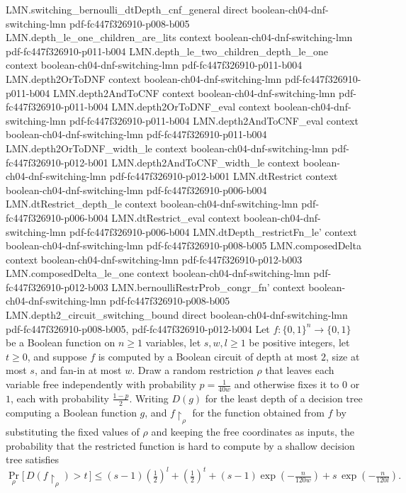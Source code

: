 \begin{lemma}
\proofstep
  {LMN.switching_bernoulli_dtDepth_cnf_general}
  {direct}
  {boolean-ch04-dnf-switching-lmn}
  {pdf-fc447f326910-p008-b005}
\proofstep
  {LMN.depth_le_one_children_are_lits}
  {context}
  {boolean-ch04-dnf-switching-lmn}
  {pdf-fc447f326910-p011-b004}
\proofstep
  {LMN.depth_le_two_children_depth_le_one}
  {context}
  {boolean-ch04-dnf-switching-lmn}
  {pdf-fc447f326910-p011-b004}
\proofstep
  {LMN.depth2OrToDNF}
  {context}
  {boolean-ch04-dnf-switching-lmn}
  {pdf-fc447f326910-p011-b004}
\proofstep
  {LMN.depth2AndToCNF}
  {context}
  {boolean-ch04-dnf-switching-lmn}
  {pdf-fc447f326910-p011-b004}
\proofstep
  {LMN.depth2OrToDNF_eval}
  {context}
  {boolean-ch04-dnf-switching-lmn}
  {pdf-fc447f326910-p011-b004}
\proofstep
  {LMN.depth2AndToCNF_eval}
  {context}
  {boolean-ch04-dnf-switching-lmn}
  {pdf-fc447f326910-p011-b004}
\proofstep
  {LMN.depth2OrToDNF_width_le}
  {context}
  {boolean-ch04-dnf-switching-lmn}
  {pdf-fc447f326910-p012-b001}
\proofstep
  {LMN.depth2AndToCNF_width_le}
  {context}
  {boolean-ch04-dnf-switching-lmn}
  {pdf-fc447f326910-p012-b001}
\proofstep
  {LMN.dtRestrict}
  {context}
  {boolean-ch04-dnf-switching-lmn}
  {pdf-fc447f326910-p006-b004}
\proofstep
  {LMN.dtRestrict_depth_le}
  {context}
  {boolean-ch04-dnf-switching-lmn}
  {pdf-fc447f326910-p006-b004}
\proofstep
  {LMN.dtRestrict_eval}
  {context}
  {boolean-ch04-dnf-switching-lmn}
  {pdf-fc447f326910-p006-b004}
\proofstep
  {LMN.dtDepth_restrictFn_le'}
  {context}
  {boolean-ch04-dnf-switching-lmn}
  {pdf-fc447f326910-p008-b005}
\proofstep
  {LMN.composedDelta}
  {context}
  {boolean-ch04-dnf-switching-lmn}
  {pdf-fc447f326910-p012-b003}
\proofstep
  {LMN.composedDelta_le_one}
  {context}
  {boolean-ch04-dnf-switching-lmn}
  {pdf-fc447f326910-p012-b003}
\proofstep
  {LMN.bernoulliRestrProb_congr_fn'}
  {context}
  {boolean-ch04-dnf-switching-lmn}
  {pdf-fc447f326910-p008-b005}
\proofstep
  {LMN.depth2_circuit_switching_bound}
  {direct}
  {boolean-ch04-dnf-switching-lmn}
  {pdf-fc447f326910-p008-b005,
    pdf-fc447f326910-p012-b004}
Let $f\colon\{0,1\}^n\to\{0,1\}$ be a Boolean function on $n\ge 1$ variables, let
$s,w,l\ge 1$ be positive integers, let $t\ge 0$, and suppose $f$ is computed by a
Boolean circuit of depth at most $2$, size at most $s$, and fan-in at most $w$. Draw a
random restriction $\rho$ that leaves each variable free independently with probability
$p=\tfrac{1}{40w}$ and otherwise fixes it to $0$ or $1$, each with probability
$\tfrac{1-p}{2}$. Writing $D(g)$ for the least depth of a decision tree computing a
Boolean function $g$, and $f\!\restriction_\rho$ for the function obtained from $f$ by
substituting the fixed values of $\rho$ and keeping the free coordinates as inputs, the
probability that the restricted function is hard to compute by a shallow decision tree
satisfies
\[
  \Pr_{\rho}\!\big[\,D(f\!\restriction_\rho) > t\,\big]
  \le (s-1)\left(\tfrac12\right)^{l} + \left(\tfrac12\right)^{t}
+ (s-1)\exp\!\left(-\tfrac{n}{120w}\right) + s\,\exp\!\left(-\tfrac{n}{120l}\right).
\]
\end{lemma}

